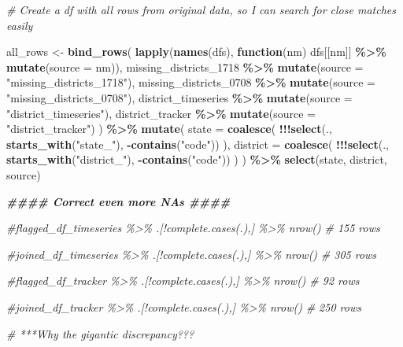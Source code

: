 \documentclass[
]{article}
\newenvironment{Shaded}{\begin{snugshade}}{\end{snugshade}}
\newcommand{\AttributeTok}[1]{\textcolor[rgb]{0.13,0.29,0.53}{#1}}
\newcommand{\CommentTok}[1]{\textcolor[rgb]{0.56,0.35,0.01}{\textit{#1}}}
\newcommand{\ControlFlowTok}[1]{\textcolor[rgb]{0.13,0.29,0.53}{\textbf{#1}}}
\newcommand{\DocumentationTok}[1]{\textcolor[rgb]{0.56,0.35,0.01}{\textbf{\textit{#1}}}}
\newcommand{\FunctionTok}[1]{\textcolor[rgb]{0.13,0.29,0.53}{\textbf{#1}}}
\newcommand{\NormalTok}[1]{#1}
\newcommand{\OtherTok}[1]{\textcolor[rgb]{0.56,0.35,0.01}{#1}}
\newcommand{\SpecialCharTok}[1]{\textcolor[rgb]{0.81,0.36,0.00}{\textbf{#1}}}
\newcommand{\StringTok}[1]{\textcolor[rgb]{0.31,0.60,0.02}{#1}}
\begin{document}
\begin{Shaded}
\begin{Highlighting}[]
\CommentTok{\# Create a df with all rows from original data, so I can search for close matches easily}

\NormalTok{all\_rows }\OtherTok{\textless{}{-}} \FunctionTok{bind\_rows}\NormalTok{(}
  \FunctionTok{lapply}\NormalTok{(}\FunctionTok{names}\NormalTok{(dfs), }\ControlFlowTok{function}\NormalTok{(nm) dfs[[nm]] }\SpecialCharTok{\%\textgreater{}\%} \FunctionTok{mutate}\NormalTok{(}\AttributeTok{source =}\NormalTok{ nm)),}
\NormalTok{  missing\_districts\_1718 }\SpecialCharTok{\%\textgreater{}\%} \FunctionTok{mutate}\NormalTok{(}\AttributeTok{source =} \StringTok{"missing\_districts\_1718"}\NormalTok{),}
\NormalTok{  missing\_districts\_0708 }\SpecialCharTok{\%\textgreater{}\%} \FunctionTok{mutate}\NormalTok{(}\AttributeTok{source =} \StringTok{"missing\_districts\_0708"}\NormalTok{),}
\NormalTok{  district\_timeseries }\SpecialCharTok{\%\textgreater{}\%} \FunctionTok{mutate}\NormalTok{(}\AttributeTok{source =} \StringTok{"district\_timeseries"}\NormalTok{),}
\NormalTok{  district\_tracker }\SpecialCharTok{\%\textgreater{}\%} \FunctionTok{mutate}\NormalTok{(}\AttributeTok{source =} \StringTok{"district\_tracker"}\NormalTok{)}
\NormalTok{  ) }\SpecialCharTok{\%\textgreater{}\%} 
  \FunctionTok{mutate}\NormalTok{(}
    \AttributeTok{state =} \FunctionTok{coalesce}\NormalTok{(}
      \SpecialCharTok{!!!}\FunctionTok{select}\NormalTok{(., }\FunctionTok{starts\_with}\NormalTok{(}\StringTok{"state\_"}\NormalTok{), }\SpecialCharTok{{-}}\FunctionTok{contains}\NormalTok{(}\StringTok{"code"}\NormalTok{))}
\NormalTok{    ),}
    \AttributeTok{district =} \FunctionTok{coalesce}\NormalTok{(}
      \SpecialCharTok{!!!}\FunctionTok{select}\NormalTok{(., }\FunctionTok{starts\_with}\NormalTok{(}\StringTok{"district\_"}\NormalTok{), }\SpecialCharTok{{-}}\FunctionTok{contains}\NormalTok{(}\StringTok{"code"}\NormalTok{))}
\NormalTok{    )}
\NormalTok{  ) }\SpecialCharTok{\%\textgreater{}\%}
  \FunctionTok{select}\NormalTok{(state, district, source)}



\DocumentationTok{\#\#\#\# Correct even more NAs \#\#\#\#}

\CommentTok{\#flagged\_df\_timeseries \%\textgreater{}\% .[!complete.cases(.),] \%\textgreater{}\% nrow()}
\CommentTok{\# 155 rows}

\CommentTok{\#joined\_df\_timeseries \%\textgreater{}\% .[!complete.cases(.),] \%\textgreater{}\% nrow()}
\CommentTok{\# 305 rows}

\CommentTok{\#flagged\_df\_tracker \%\textgreater{}\% .[!complete.cases(.),] \%\textgreater{}\% nrow()}
\CommentTok{\# 92 rows}

\CommentTok{\#joined\_df\_tracker \%\textgreater{}\% .[!complete.cases(.),] \%\textgreater{}\% nrow()}
\CommentTok{\# 250 rows}


\CommentTok{\# ***Why the gigantic discrepancy???}
\end{Highlighting}
\end{Shaded}
\end{document}
